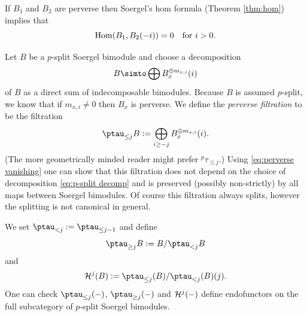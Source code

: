 \documentclass[11pt]{amsart}
\numberwithin{equation}{section}
\def\to{\rightarrow}
\theoremstyle{definition}
\theoremstyle{remark}
\begin{document}
{If $B_1$ and $B_2$ are perverse then Soergel's hom formula
(Theorem \ref{thm:hom}) implies that \begin{equation} \label{eq:perverse vanishing} \operatorname{Hom}(B_1, B_2(-i)) = 0 \quad \text{for $i > 0$}. \end{equation}

Let $B$ be a $p$-split Soergel bimodule and choose a decomposition
\begin{equation}
  \label{eq:p-split decomp}
  B \simto \bigoplus B_x^{\oplus m_{x,i}}(i)
\end{equation}
of $B$ as a direct sum of indecomposable bimodules. Because $B$ is
assumed $p$-split, we know that if $m_{x,i} \ne 0$ then $B_x$ is
perverse. We define the \emph{perverse filtration} to be the
filtration
\[
\ptau_{\le j} B := \bigoplus_{i \ge -j} B_x^{\oplus m_{x,i}}(i).
\]
(The more geometrically minded reader might prefer
  ${}^p \tau_{\le j}$.) Using \eqref{eq:perverse vanishing} one can show that this
filtration does not depend on the choice of decomposition
\eqref{eq:p-split decomp} and is preserved (possibly non-strictly) by
all maps between Soergel bimodules. Of course this filtration always
splits, however the splitting is not canonical in general.

We set $\ptau_{< j} := \ptau_{\le j-1}$ and define
\[
\ptau_{\ge j} B := B/ \ptau_{<j} B
\]
and
\[
 \HC ^j(B) := \ptau_{\le j}(B)/\ptau_{< j}(B)(j).
\]
One can check $\ptau_{\le j}(-)$, $\ptau_{\ge j}(-)$ and ${\mathcal{H}}^j(-)$
define endofunctors on the full subcategory of $p$-split Soergel
bimodules.


}
\end{document}
